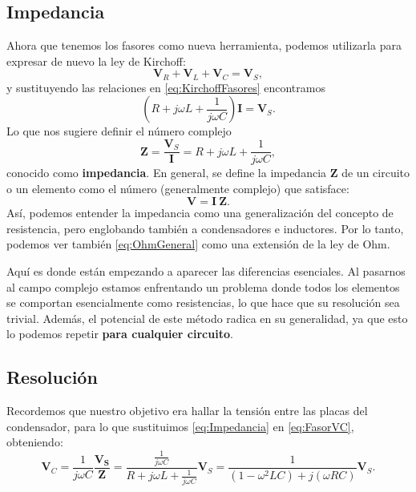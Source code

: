 \subsection{Impedancia}
Ahora que tenemos los fasores como nueva herramienta, podemos utilizarla para expresar de nuevo la ley de Kirchoff:
\begin{equation}
  \label{eq:KirchoffFasores}
  \mathbf{V}_R + \mathbf{V}_L + \mathbf{V}_C = \mathbf{V}_S,
\end{equation}
y sustituyendo las relaciones  en \eqref{eq:KirchoffFasores} encontramos
\[
  \left(R + j\omega L + \frac{1}{j\omega C}\right) \mathbf{I} = \mathbf{V}_S.
\]
Lo que nos sugiere definir el número complejo
\begin{equation}
  \label{eq:Impedancia}
  \mathbf{Z}=\frac{\mathbf{V}_S}{\mathbf{I}} = R + j\omega L + \frac{1}{j\omega C},
\end{equation}
conocido como \textbf{impedancia}. En general, se define la impedancia $\mathbf{Z}$ de un circuito o un elemento como el número (generalmente complejo) que satisface:
\begin{equation}
  \label{eq:OhmGeneral}
  \mathbf{V} = \mathbf{I}\ \mathbf{Z}.
\end{equation}
Así, podemos entender la impedancia como una generalización del concepto de resistencia, pero englobando también a condensadores e inductores. Por lo tanto, podemos ver también \eqref{eq:OhmGeneral} como una extensión de la ley de Ohm. 

Aquí es donde están empezando a aparecer las diferencias esenciales. Al pasarnos al campo complejo estamos enfrentando un problema donde todos los elementos se comportan esencialmente como resistencias, lo que hace que su resolución sea trivial. Además, el potencial de este método radica en su generalidad, ya que esto lo podemos repetir \textbf{para cualquier circuito}.


\subsection{Resolución}
 Recordemos que nuestro objetivo era hallar la tensión entre las placas del condensador, para lo que sustituimos \eqref{eq:Impedancia} en \eqref{eq:FasorVC}, obteniendo:
\begin{equation}
  \label{eq:SolFasor}
  \mathbf{V}_C = \frac{1}{j\omega C} \frac{\mathbf{V_S}}{\mathbf{Z}} =\frac{\frac{1}{j\omega C}}{R + j\omega L + \frac{1}{j\omega C}} \mathbf{V}_S = \frac{1}{(1-\omega^2 LC) + j(\omega RC)} \mathbf{V}_S.
\end{equation}

